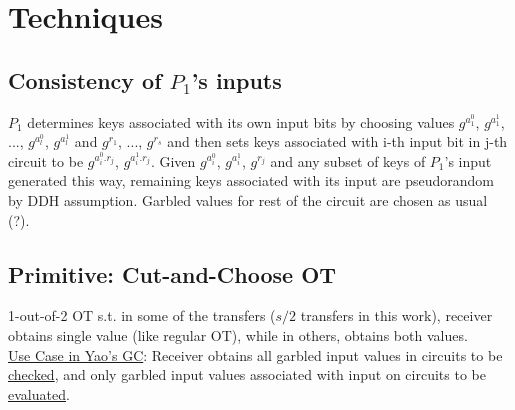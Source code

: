 %

\section{Techniques}
\subsection{Consistency of $P_1$'s inputs}
$P_1$ determines keys associated with its own input bits by choosing values $g^{a_1^0}$, $g^{a_1^1}$, ..., $g^{a_l^0}$, $g^{a_l^1}$ and $g^{r_1}$, ..., $g^{r_s}$ and then sets keys associated with i-th input bit in j-th circuit to be $g^{a_i^0.r_j}$, $g^{a_i^1.r_j}$. Given $g^{a_i^0}$, $g^{a_i^1}$, $g^{r_j}$ and any subset of keys of $P_1$'s input generated this way, remaining keys associated with its input are pseudorandom by DDH assumption. Garbled values for rest of the circuit are chosen as usual (?).

\subsection{Primitive: Cut-and-Choose OT}
1-out-of-2 OT s.t. in some of the transfers ($s/2$ transfers in this work), receiver obtains single value (like regular OT), while in others, obtains both values. \\

\underline{Use Case in Yao's GC}: Receiver obtains all garbled input values in circuits to be \underline{checked}, and only garbled input values associated with input on circuits to be \underline{evaluated}. \\

